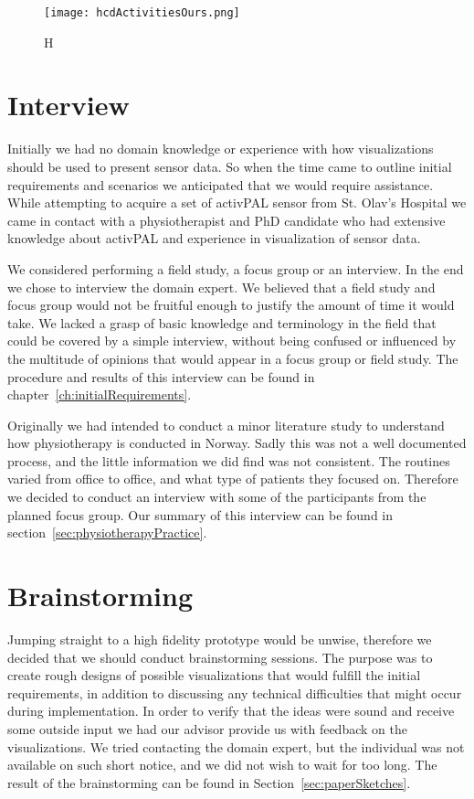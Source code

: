 \begin{figure}[h!]
	\centering
		\texttt{[image: hcdActivitiesOurs.png]}
		\caption{\footnotesize H}
		\label{fig:hcdActivitiesOurs}
\end{figure}

\section{Interview}
Initially we had no domain knowledge or experience with how visualizations should be used to present sensor data. So when the time came to outline initial requirements and scenarios we anticipated that we would require assistance. While attempting to acquire a set of activPAL sensor from St. Olav's Hospital we came in contact with a physiotherapist and PhD candidate who had extensive knowledge about activPAL and experience in visualization of sensor data. 

We considered performing a field study, a focus group or an interview. In the end we chose to interview the domain expert. We believed that a field study and focus group would not be fruitful enough to justify the amount of time it would take. We lacked a grasp of basic knowledge and terminology in the field that could be covered by a simple interview, without being confused or influenced by the multitude of opinions that would appear in a focus group or field study. The procedure and results of this interview can be found in chapter~\ref{ch:initialRequirements}. 

Originally we had intended to conduct a minor literature study to understand how physiotherapy is conducted in Norway. Sadly this was not a well documented process, and the little information we did find was not consistent. The routines varied from office to office, and what type of patients they focused on. Therefore we decided to conduct an interview with some of the participants from the planned focus group. Our summary of this interview can be found in section~\ref{sec:physiotherapyPractice}.
 
\section{Brainstorming}
Jumping straight to a high fidelity prototype would be unwise, therefore we decided that we should conduct brainstorming sessions. The purpose was to create rough designs of possible visualizations that would fulfill the initial requirements, in addition to discussing any technical difficulties that might occur during implementation. In order to verify that the ideas were sound and receive some outside input we had our advisor provide us with feedback on the visualizations. We tried contacting the domain expert, but the individual was not available on such short notice, and we did not wish to wait for too long. The result of the brainstorming can be found in Section~\ref{sec:paperSketches}.

